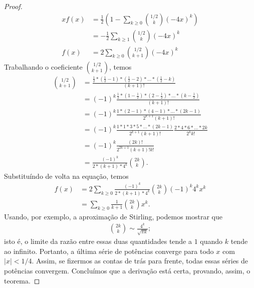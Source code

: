 \begin{proof}
    \begin{align*}
        xf(x) &= \frac 1 2 \left( 1 - \sum_{k \geq 0} \binom{1/2}{k} (-4x)^k \right) \\
              &= -\frac 1 2 \sum_{k \geq 1} \binom{1/2}{k} (-4x)^k \\
        f(x) &= 2 \sum_{k \geq 0} \binom{1/2}{k+1} (-4x)^k
    \end{align*}
    Trabalhando o coeficiente $\binom{1/2}{k+1}$, temos
    \begin{align*}
        \binom{1/2}{k+1} &= \frac{
            \frac 1 2 * (\frac 1 2 - 1) * (\frac 1 2 - 2) * \dots * (\frac 1 2 - k)
        }{ (k+1)! } \\
        &= (-1)^k \frac{
            \frac 1 2 * (1 - \frac 1 2) * (2 - \frac 1 2) * \dots * (k - \frac 1 2)
        }{ (k+1)! } \\
        &= (-1)^k \frac{
            1 * (2 - 1) * (4 - 1) * \dots * (2k - 1)
        }{ 2^{k + 1} (k + 1)! } \\
        &= (-1)^k \frac{ 1 * 1 * 3 * 5 * \dots * (2k - 1) }{2^{k+1} (k+1)!}
            \frac{2 * 4 * 6 * \dots * 2k}{2^k k!} \\
        &= (-1)^k \frac{ (2k)! }{2^{2k+1} (k+1)! k!} \\
        &= \frac{(-1)^k}{2 * (k+1) * 4^k} \binom{2k}{k}.
    \end{align*}
    Substituíndo de volta na equação, temos
    \begin{align*}
        f(x) &= 2\sum_{k \geq 0}
            \frac{(-1)^k}{2*(k+1) * 4^k} \binom{2k}{k} (-1)^k 4^k x^k \\
            &= \sum_{k \geq 0} \frac 1 {k+1} \binom{2k} k x^k.
    \end{align*}
    Usando, por exemplo,
    a aproximação de Stirling,
    podemos mostrar que
    \begin{align*}
        \binom{2k} k \sim \frac{4^k}{\sqrt{\pi k}};
    \end{align*}
    isto é, o limite da razão entre essas duas quantidades tende a $1$
    quando $k$ tende ao infinito.
    Portanto, a última série de potências converge para todo $x$ com $|x| < 1/4$.
    Assim, se fizermos as contas de trás para frente,
    todas essas séries de potências convergem.
    Concluímos que a derivação está certa,
    provando, assim, o teorema.
\end{proof}

